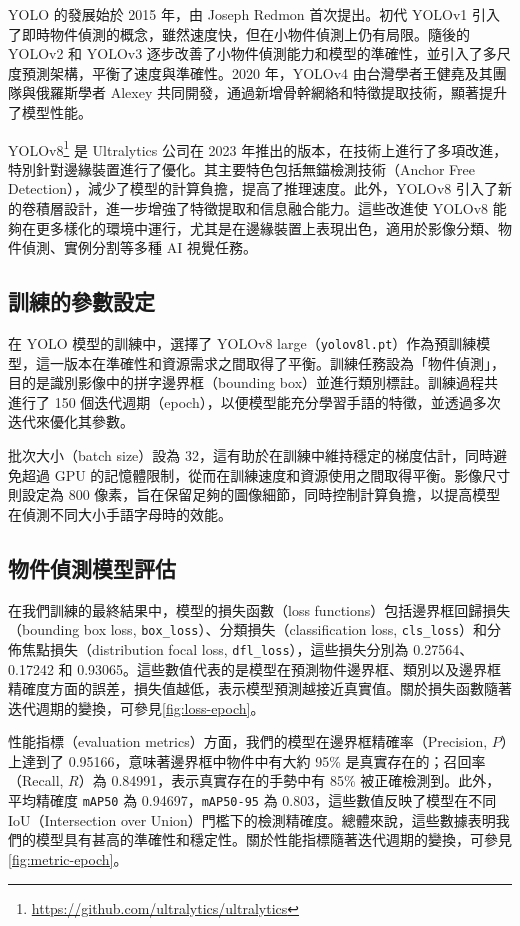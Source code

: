 \documentclass[conference]{IEEEtran}
\begin{document}
YOLO 的發展始於 2015 年，由 Joseph Redmon 首次提出\cite{redmon2016}。初代 YOLOv1 引入了即時物件偵測的概念，雖然速度快，但在小物件偵測上仍有局限。隨後的 YOLOv2 和 YOLOv3 逐步改善了小物件偵測能力和模型的準確性，並引入了多尺度預測架構，平衡了速度與準確性。2020 年，YOLOv4 由台灣學者王健堯及其團隊與俄羅斯學者 Alexey 共同開發，通過新增骨幹網絡和特徵提取技術，顯著提升了模型性能\cite{yolov4}。

YOLOv8\footnote{\url{https://github.com/ultralytics/ultralytics}} 是 Ultralytics 公司在 2023 年推出的版本，在技術上進行了多項改進，特別針對邊緣裝置進行了優化。其主要特色包括無錨檢測技術（Anchor Free Detection），減少了模型的計算負擔，提高了推理速度。此外，YOLOv8 引入了新的卷積層設計，進一步增強了特徵提取和信息融合能力。這些改進使 YOLOv8 能夠在更多樣化的環境中運行，尤其是在邊緣裝置上表現出色，適用於影像分類、物件偵測、實例分割等多種 AI 視覺任務\cite{zhai2023yolo}。 

\subsection{訓練的參數設定}
在 YOLO 模型的訓練中，選擇了 YOLOv8 large（\verb|yolov8l.pt|）作為預訓練模型，這一版本在準確性和資源需求之間取得了平衡。訓練任務設為「物件偵測」，目的是識別影像中的拼字邊界框（bounding box）並進行類別標註。訓練過程共進行了 150 個迭代週期（epoch），以便模型能充分學習手語的特徵，並透過多次迭代來優化其參數。

批次大小（batch size）設為 32，這有助於在訓練中維持穩定的梯度估計，同時避免超過 GPU 的記憶體限制，從而在訓練速度和資源使用之間取得平衡。影像尺寸則設定為 800 像素，旨在保留足夠的圖像細節，同時控制計算負擔，以提高模型在偵測不同大小手語字母時的效能。

\subsection{物件偵測模型評估}
在我們訓練的最終結果中，模型的損失函數（loss functions）包括邊界框回歸損失（bounding box loss, \verb|box_loss|）、分類損失（classification loss, \verb|cls_loss|）和分佈焦點損失（distribution focal loss, \verb|dfl_loss|），這些損失分別為 0.27564、0.17242 和 0.93065。這些數值代表的是模型在預測物件邊界框、類別以及邊界框精確度方面的誤差，損失值越低，表示模型預測越接近真實值。關於損失函數隨著迭代週期的變換，可參見\cref{fig:loss-epoch}。

性能指標（evaluation metrics）方面，我們的模型在邊界框精確率（Precision, $P$）上達到了 0.95166，意味著邊界框中物件中有大約 95\% 是真實存在的；召回率（Recall, $R$）為 0.84991，表示真實存在的手勢中有 85\% 被正確檢測到。此外，平均精確度 \verb|mAP50| 為 0.94697，\verb|mAP50-95| 為 0.803，這些數值反映了模型在不同 IoU（Intersection over Union）門檻下的檢測精確度。總體來說，這些數據表明我們的模型具有甚高的準確性和穩定性。關於性能指標隨著迭代週期的變換，可參見\cref{fig:metric-epoch}。
\end{document}
